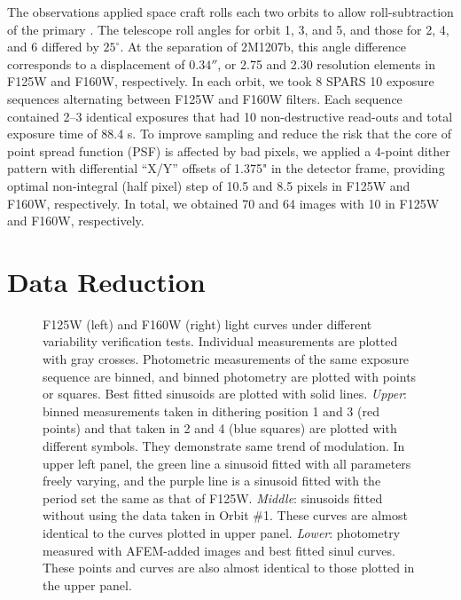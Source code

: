 \documentclass[apj]{emulateapj}
\newcommand{\revise}[1]{\textbf{{\color{cyan}{#1}}}}
\renewcommand{\revise}{}
\begin{document}
The observations applied space craft rolls each two orbits to allow
roll-subtraction of the primary \citep[e.g.][]{Song2006}. The
telescope roll angles for orbit 1, 3, and 5, and those for 2, 4, and 6
differed by $25^{\circ}$. At the separation of 2M1207b, this angle
difference corresponds to a displacement of $0.34''$, or 2.75 and 2.30
resolution elements in F125W and F160W, respectively.
\revise{In each orbit, we took 8 SPARS 10 exposure sequences
  alternating between F125W and F160W filters. Each sequence contained
  2--3 identical exposures that had 10 non-destructive read-outs and total
  exposure time of 88.4 s.} To improve sampling and reduce the risk
that the core of point spread function (PSF) is affected by bad
pixels, we applied a 4-point dither pattern with differential ``X/Y''
offsets of 1.375" in the detector frame, providing optimal
non-integral (half pixel) step of 10.5 and 8.5 pixels in F125W and
F160W, respectively. In total, we obtained 70 and 64 images with 10 in
F125W and F160W, respectively.

\section{Data Reduction}

 \begin{figure}
  \centering
  \caption{F125W (left) and F160W (right) light curves under different
    variability verification tests. Individual measurements are
    plotted with gray crosses. Photometric measurements of the same exposure
    sequence are binned, and binned photometry are plotted with points
    or squares. Best fitted sinusoids are plotted with solid
    lines. {\em Upper}: binned measurements taken in dithering
    position 1 and 3 (red points) and that taken in 2 and 4 (blue
    squares) are plotted with different symbols. They demonstrate same
    trend of modulation. In upper left panel, the green line a sinusoid
    fitted with all parameters freely varying, and the purple line is
    a sinusoid fitted with the period set the same as that of
    F125W. {\em Middle}: sinusoids fitted without using the
    data taken in Orbit \#1. These curves are almost identical to the
    curves plotted in upper panel. {\em Lower}: photometry measured
    with AFEM-added images and best fitted sinul curves. These
    points and curves are also almost identical to those plotted
    in the upper panel.}
  \label{fig:2}
  
\end{figure}
\end{document}
